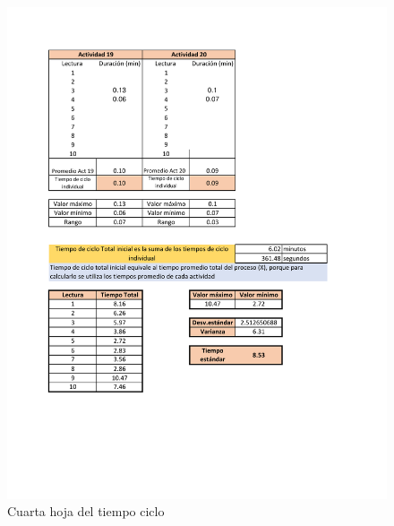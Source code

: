     \begin{figure}[H]
        \centering
        \includegraphics[trim = {1mm 1mm 1mm 1mm},clip,scale=0.45]{34/img/tiempoCicloEnsamble10Lecturas4.pdf}
        \caption{Cuarta hoja del tiempo ciclo}
        \label{fig:tiempoCicloEnsamble10Lecturas4}
    \end{figure}
    
    
    
    
